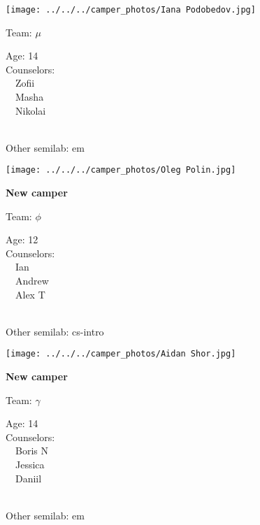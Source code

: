 \documentclass[10pt,letterpaper, landscape]{article}
\begin{document}
\verticalshiftfornextsticker
\renewcommand{\baselinestretch}{1} \begin{sticker}
\noindent\begin{minipage}{0.5\textwidth}\texttt{[image: ../../../camper\_photos/Iana Podobedov.jpg]}\end{minipage}\begin{minipage}{0.45\textwidth}
Team: {\Large $\mu$}

Age:        14\\
Counselors: \\\ \ Zofii\\\ \ Masha\\\ \ Nikolai\\
\end{minipage} \\ \vspace{0.07in}
Other semilab: em
\end{sticker}
\horizontalshiftfornextsticker
\renewcommand{\baselinestretch}{1} \begin{sticker}
\noindent\begin{minipage}{0.5\textwidth}\texttt{[image: ../../../camper\_photos/Oleg Polin.jpg]}\end{minipage}\begin{minipage}{0.45\textwidth}
\textbf{New camper} 

Team: {\Large $\phi$}

Age:        12\\
Counselors: \\\ \ Ian\\\ \ Andrew\\\ \ Alex T\\
\end{minipage} \\ \vspace{0.07in}
Other semilab: cs-intro
\end{sticker}
\horizontalshiftfornextsticker
\renewcommand{\baselinestretch}{1} \begin{sticker}
\noindent\begin{minipage}{0.5\textwidth}\texttt{[image: ../../../camper\_photos/Aidan Shor.jpg]}\end{minipage}\begin{minipage}{0.45\textwidth}
\textbf{New camper} 

Team: {\Large $\gamma$}

Age:        14\\
Counselors: \\\ \ Boris N\\\ \ Jessica\\\ \ Daniil\\
\end{minipage} \\ \vspace{0.07in}
Other semilab: em
\end{sticker}
\end{document}
